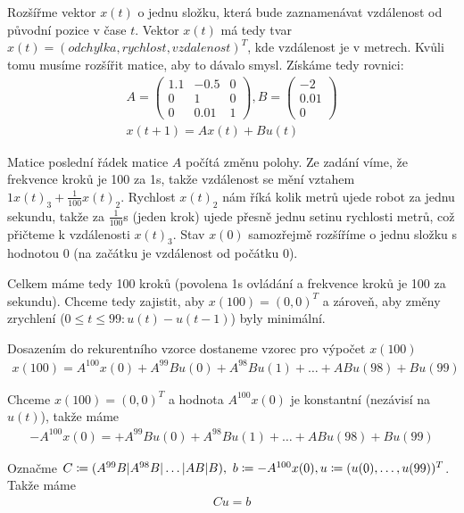 \documentclass[12pt, a4paper]{article}
\begin{document}
\section{}
Rozšířme vektor $x(t)$ o jednu složku, která bude zaznamenávat vzdálenost od původní pozice v čase $t$. Vektor $x(t)$ má tedy tvar \\$x(t)=(odchylka, rychlost, vzdalenost)^T$, kde vzdálenost je v metrech. Kvůli tomu musíme rozšířit matice, aby to dávalo smysl. Získáme tedy rovnici:
\begin{gather*}
A = \begin{pmatrix}
1.1 & -0.5 & 0\\
0 & 1 & 0\\
0 & 0.01 & 1
\end{pmatrix},
B = \begin{pmatrix}
-2\\
0.01\\
0
\end{pmatrix}\\
x(t+1)= Ax(t) + Bu(t)
\end{gather*}

Matice poslední řádek matice $A$ počítá změnu polohy. Ze zadání víme, že frekvence kroků je 100 za 1s, takže vzdálenost se mění vztahem $1x(t)_3 + \frac{1}{100}x(t)_2$. Rychlost $x(t)_2$ nám říká kolik metrů ujede robot za jednu sekundu, takže za $\frac{1}{100}$s (jeden krok) ujede přesně jednu setinu rychlosti metrů, což přičteme k vzdálenosti $x(t)_3$. Stav $x(0)$ samozřejmě rozšíříme o jednu složku s hodnotou 0 (na začátku je vzdálenost od počátku 0).

Celkem máme tedy 100 kroků (povolena 1s ovládání a frekvence kroků je 100 za sekundu). Chceme tedy zajistit, aby $x(100)=(0,0)^T$ a zároveň, aby změny zrychlení ($0 \leq t \leq 99: u(t)-u(t-1)$) byly minimální.

Dosazením do rekurentního vzorce dostaneme vzorec pro výpočet $x(100)$
\begin{gather*}
x(100)=A^{100} x(0) + A^{99}Bu(0) + A^{98}Bu(1) + \dots + ABu(98) + Bu(99) 
\end{gather*}

Chceme $x(100)=(0,0)^T$ a hodnota $A^{100}x(0)$ je konstantní (nezávisí na $u(t)$), takže máme
\begin{gather*}
-A^{100} x(0) = + A^{99}Bu(0) + A^{98}Bu(1) + \dots + ABu(98) + Bu(99) 
\end{gather*}

Označme $C \coloneqq (A^{99}B|A^{98}B|\dots|AB|B),\ b \coloneqq -A^{100}x(0),\\ u \coloneqq (u(0), \dots, u(99))^T$. Takže máme
\begin{gather*}
Cu=b
\end{gather*}
\end{document}
